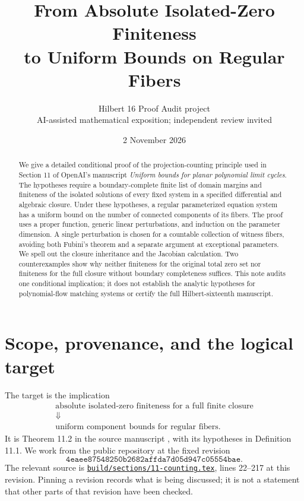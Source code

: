 \documentclass[11pt]{article}
\title{From Absolute Isolated-Zero Finiteness\\
to Uniform Bounds on Regular Fibers}
\author{Hilbert 16 Proof Audit project\\
\small AI-assisted mathematical exposition; independent review invited}
\date{2 November 2026}
\theoremstyle{definition}
\theoremstyle{remark}
\newcommand{\sourcecommit}{\texttt{4eaee87548250b2682affda7d05d947c05554bae}}
\begin{document}
\maketitle

\begin{abstract}
We give a detailed conditional proof of the projection-counting principle
used in Section 11 of OpenAI's manuscript \emph{Uniform bounds for planar
polynomial limit cycles}. The hypotheses require a boundary-complete
finite list of domain margins and finiteness of the isolated solutions
of every fixed system in a specified differential and algebraic closure.
Under these hypotheses, a regular parameterized equation system has a
uniform bound on the number of connected components of its fibers.
The proof uses a proper function, generic linear perturbations, and
induction on the parameter dimension. A single perturbation is chosen
for a countable collection of witness fibers, avoiding both Fubini's
theorem and a separate argument at exceptional parameters. We spell out
the closure inheritance and the Jacobian calculation. Two counterexamples
show why neither finiteness for the original total zero set nor
finiteness for the full closure without boundary completeness suffices.
This note audits one conditional implication; it does not establish the
analytic hypotheses for polynomial-flow matching systems or certify
the full Hilbert-sixteenth manuscript.
\end{abstract}

{\small\tableofcontents}
\clearpage

\section{Scope, provenance, and the logical target}
\label{sec:scope}

The target is the implication
\[
 \begin{gathered}
 \text{absolute isolated-zero finiteness for a full finite closure}\\
 \Downarrow\\
 \text{uniform component bounds for regular fibers}.
 \end{gathered}
\]
It is Theorem 11.2 in the source manuscript \cite{OpenAI}, with its
hypotheses in Definition 11.1. We work from the public repository at the
fixed revision
\[
 \sourcecommit.
\]
The relevant source is
\href{https://github.com/openai/math/blob/4eaee87548250b2682affda7d05d947c05554bae/preprints/uniform-bounds-for-planar-polynomial-limit-cycles-September-24-2026/build/sections/11-counting.tex}{\texttt{build/sections/11-counting.tex}},
lines 22--217 at this revision. Pinning a revision records what is being
discussed; it is not a statement that other parts of that revision have
been checked.
\end{document}

